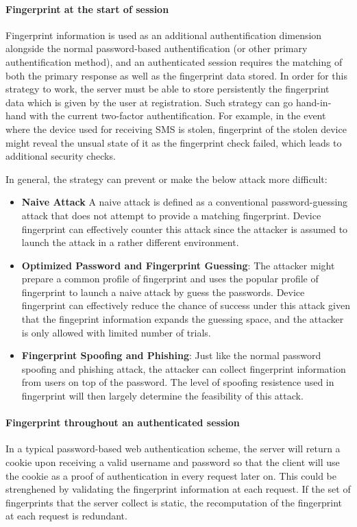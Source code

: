 \documentclass{acm_proc_article-sp}
\begin{document}
\paragraph{Fingerprint at the start of session}
Fingerprint information is used as an additional authentification dimension alongside the normal password-based authentification (or other primary authentification method), and an authenticated session requires the matching of both the primary response as well as the fingerprint data stored.
In order for this strategy to work, the server must be able to store persistently the fingerprint data which is given by the user at registration. 
Such strategy can go hand-in-hand with the current two-factor authentification. For example, in the event where the device used for receiving SMS is stolen, fingerprint of the stolen device might reveal the unsual state of it as the fingerprint check failed, which leads to additional security checks.

In general, the strategy can prevent or make the below attack more difficult: 
\begin{itemize}
    \item \textbf{Naive Attack} A naive attack is defined as a conventional password-guessing attack that does not attempt to provide a matching fingerprint. Device fingerprint can effectively counter this attack since the attacker is assumed to launch the attack in a rather different environment. 
    \item \textbf{Optimized Password and Fingerprint Guessing}: The attacker might prepare a common profile of fingerprint and uses the popular profile of fingerprint to launch a naive attack by guess the passwords. Device fingerprint can effectively reduce the chance of success under this attack given that the fingeprint information expands the guessing space, and the attacker is only allowed with limited number of trials. 
    \item \textbf{Fingerprint Spoofing and Phishing}: Just like the normal password spoofing and phishing attack, the attacker can collect fingerprint information from users on top of the password. The level of spoofing resistence used in fingerprint will then largely determine the feasibility of this attack. 
\end{itemize}

\paragraph{Fingerprint throughout an authenticated session}
In a typical password-based web authentication scheme, the server will return a cookie upon receiving a valid username and password so that the client will use the cookie as a proof of authentication in every request later on. This could be strenghened by validating the fingerprint information at each request. If the set of fingerprints that the server collect is static, the recomputation of the fingerprint at each request is redundant.
\end{document}
